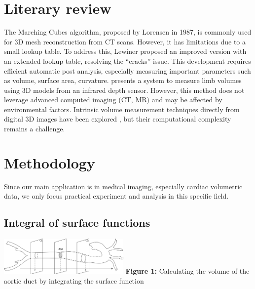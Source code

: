 \documentclass[11pt]{article}
\begin{document}
\begin{multicols}{2}
\section{Literary review}
The Marching Cubes algorithm, proposed by Lorensen in 1987, is commonly used for 3D mesh reconstruction from CT scans. However, it has limitations due to a small lookup table. To address this, Lewiner \cite{lewiner} proposed an improved version with an extended lookup table, resolving the “cracks” issue. This development requires efficient automatic post analysis, especially measuring important parameters such as volume, surface area, curvature. \cite{limb} presents a system to measure limb volumes using 3D models from an infrared depth sensor. However, this method does not leverage advanced computed imaging (CT, MR) and may be affected by environmental factors. Intrinsic volume measurement techniques directly from digital 3D images have been explored \cite{intrinsic}, but their computational complexity remains a challenge. 

\section{Methodology}
Since our main application is in medical imaging, especially cardiac volumetric data, we only focus practical experiment and analysis in this specific field. 

\subsection{Integral of surface functions}

\includegraphics[width=0.48\textwidth]{Figures/Integral Surface Function.png}
\textbf{Figure 1:} Calculating the volume of the aortic duct by integrating the surface function \\


\end{multicols}
\end{document}
